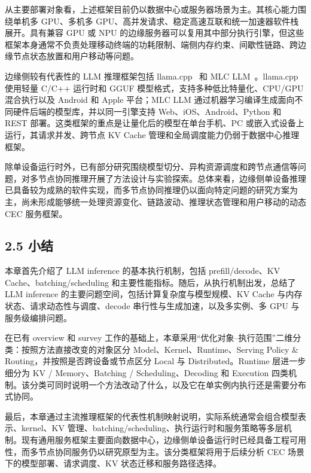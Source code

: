 从主要部署对象看，上述框架目前仍以数据中心或服务器场景为主。其核心能力围绕单机多 GPU、多机多 GPU、高并发请求、稳定高速互联和统一加速器软件栈展开。具有兼容 GPU 或 NPU 的边缘服务器可以复用其中部分执行引擎，但这些框架本身通常不负责处理移动终端的功耗限制、端侧内存约束、间歇性链路、跨边缘节点状态放置和用户移动等问题。

边缘侧较有代表性的 LLM 推理框架包括 llama.cpp~\cite{llamacpp2026documentation} 和 MLC LLM~\cite{mlcllm2026documentation}。llama.cpp 使用轻量 C/C++ 运行时和 GGUF 模型格式，支持多种低比特量化、CPU/GPU 混合执行以及 Android 和 Apple 平台；MLC LLM 通过机器学习编译生成面向不同硬件后端的模型库，并以同一引擎支持 Web、iOS、Android、Python 和 REST 部署。这类框架的重点是让量化后的模型在单台手机、PC 或嵌入式设备上运行，其请求并发、跨节点 KV Cache 管理和全局调度能力仍弱于数据中心推理框架。

除单设备运行时外，已有部分研究围绕模型切分、异构资源调度和跨节点通信等问题，对多节点协同推理开展了方法设计与实验探索。总体来看，边缘侧单设备推理已具备较为成熟的软件实现，而多节点协同推理仍以面向特定问题的研究方案为主，尚未形成能够统一处理资源变化、链路波动、推理状态管理和用户移动的动态 CEC 服务框架。




\subsection*{2.5 小结}

本章首先介绍了 LLM inference 的基本执行机制，包括 prefill/decode、KV Cache、batching/scheduling 和主要性能指标。随后，从执行机制出发，总结了 LLM inference 的主要问题空间，包括计算复杂度与模型规模、KV Cache 与内存状态、请求动态性与调度、decode 串行性与生成加速，以及多实例、多 GPU 与服务级编排问题。


在已有 overview 和 survey 工作的基础上，本章采用“优化对象--执行范围”二维分类：按照方法直接改变的对象区分 Model、Kernel、Runtime、Serving Policy \& Routing，并按照是否跨设备或节点区分 Local 与 Distributed。Runtime 层进一步细分为 KV / Memory、Batching / Scheduling、Decoding 和 Execution 四类机制。该分类可同时说明一个方法改动了什么，以及它在单实例内执行还是需要分布式协同。


最后，本章通过主流推理框架的代表性机制映射说明，实际系统通常会组合模型表示、kernel、KV 管理、batching/scheduling、执行运行时和服务策略等多层机制。现有通用服务框架主要面向数据中心，边缘侧单设备运行时已经具备工程可用性，而多节点协同服务仍以研究原型为主。该分类框架将用于后续分析 CEC 场景下的模型部署、请求调度、KV 状态迁移和服务路径选择。
